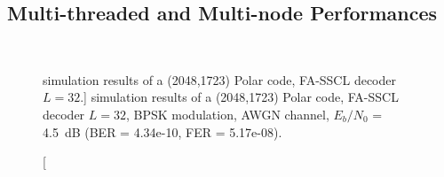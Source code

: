 \subsection{Multi-threaded and Multi-node Performances}

\begin{figure}[htp]
  \centering
  \\
  \caption
    [\AFFECT simulation results of a (2048,1723) Polar code, FA-SSCL decoder
     $L=32$.]
    {\AFFECT simulation results of a (2048,1723) Polar code, FA-SSCL decoder
     $L=32$, BPSK modulation, AWGN channel, $E_b/N_0$ = 4.5~dB (BER = 4.34e-10,
     FER = 5.17e-08).}
  \label{plot:eval_simu_speedup_throughput}
\end{figure}

